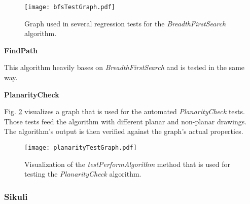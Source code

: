 \begin{figure}[!h]
	\centering
	\texttt{[image: bfsTestGraph.pdf]}
	\caption{Graph used in several regression tests for the \emph{BreadthFirstSearch} algorithm.}
	\label{img:bfsTestGraph}
\end{figure}

\pagebreak
\textbf{FindPath}\par
This algorithm heavily bases on \emph{BreadthFirstSearch} and is tested in the same way.\par

\textbf{PlanarityCheck}\par
Fig. \ref{img:planarityTestGraph} visualizes a graph that is used for the automated \emph{PlanarityCheck} tests. Those tests feed the algorithm with different planar and non-planar drawings. The algorithm's output is then verified against the graph's actual properties.\par

\begin{figure}[!h]
	\centering
	\texttt{[image: planarityTestGraph.pdf]}
	\caption{Visualization of the \emph{testPerformAlgorithm} method that is used for testing the \emph{PlanarityCheck} algorithm.}
	\label{img:planarityTestGraph}
\end{figure}


\subsubsection{Sikuli}

